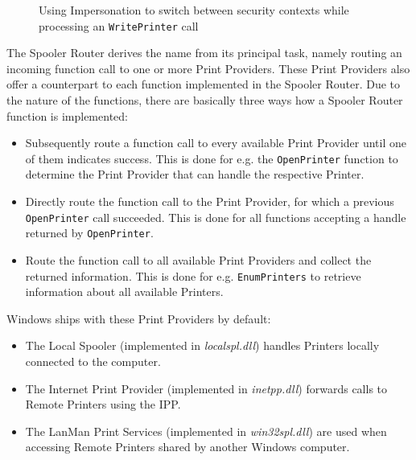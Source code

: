 \begin{figure}[h]
	
	\caption{Using Impersonation to switch between security contexts while processing an \texttt{WritePrinter} call}
	\label{fig:WritePrinterProcessing}
\end{figure}

The Spooler Router derives the name from its principal task, namely routing an incoming function call to one or more Print Providers.
These Print Providers also offer a counterpart to each function implemented in the Spooler Router.
Due to the nature of the functions, there are basically three ways how a Spooler Router function is implemented:

\begin{itemize}
	\item Subsequently route a function call to every available Print Provider until one of them indicates success.
	      This is done for e.g. the \texttt{OpenPrinter} function to determine the Print Provider that can handle the respective Printer.
	\item Directly route the function call to the Print Provider, for which a previous \texttt{OpenPrinter} call succeeded.
	      This is done for all functions accepting a handle returned by \texttt{OpenPrinter}.
	\item Route the function call to all available Print Providers and collect the returned information.
	      This is done for e.g. \texttt{EnumPrinters} to retrieve information about all available Printers.
\end{itemize}

Windows ships with these Print Providers by default:

\begin{itemize}
	\item The Local Spooler (implemented in \emph{localspl.dll}) handles Printers locally connected to the computer.
	\item The Internet Print Provider (implemented in \emph{inetpp.dll}) forwards calls to Remote Printers using the \gls{IPP}.
	\item The LanMan Print Services (implemented in \emph{win32spl.dll}) are used when accessing Remote Printers shared by another Windows computer.
\end{itemize}

